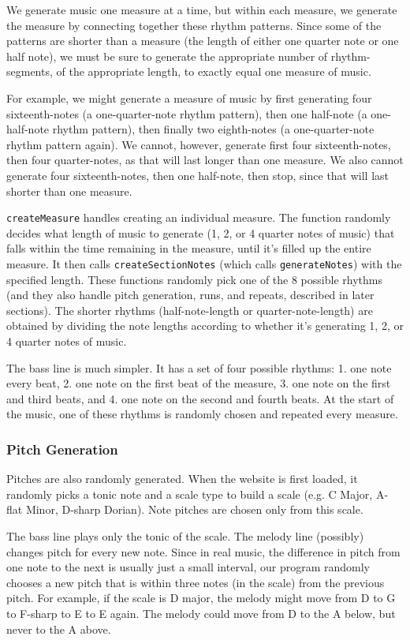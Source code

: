 \documentclass[12pt,a4paper]{article}
\newcommand{\lightcode}[1]{\colorbox{light-gray}{\texttt{#1}}}
\begin{document}
We generate music one measure at a time, but within each measure, we generate the measure by connecting together these rhythm patterns. Since some of the patterns are shorter than a measure (the length of either one quarter note or one half note), we must be sure to generate the appropriate number of rhythm-segments, of the appropriate length, to exactly equal one measure of music.

For example, we might generate a measure of music by first generating four sixteenth-notes (a one-quarter-note rhythm pattern), then one half-note (a one-half-note rhythm pattern), then finally two eighth-notes (a one-quarter-note rhythm pattern again). We cannot, however, generate first four sixteenth-notes, then four quarter-notes, as that will last longer than one measure. We also cannot generate four sixteenth-notes, then one half-note, then stop, since that will last shorter than one measure.

\lightcode{createMeasure} handles creating an individual measure. The function randomly decides what length of music to generate (1, 2, or 4 quarter notes of music) that falls within the time remaining in the measure, until it's filled up the entire measure. It then calls \lightcode{createSectionNotes} (which calls \lightcode{generateNotes}) with the specified length. These functions randomly pick one of the 8 possible rhythms (and they also handle pitch generation, runs, and repeats, described in later sections). The shorter rhythms (half-note-length or quarter-note-length) are obtained by dividing the note lengths according to whether it's generating 1, 2, or 4 quarter notes of music.  

The bass line is much simpler. It has a set of four possible rhythms: 1. one note every beat, 2. one note on the first beat of the measure, 3. one note on the first and third beats, and 4. one note on the second and fourth beats. At the start of the music, one of these rhythms is randomly chosen and repeated every measure.

\subsubsection{Pitch Generation}

Pitches are also randomly generated. When the website is first loaded, it randomly picks a tonic note and a scale type to build a scale (e.g. C Major, A-flat Minor, D-sharp Dorian). Note pitches are chosen only from this scale.

The bass line plays only the tonic of the scale. The melody line (possibly) changes pitch for every new note. Since in real music, the difference in pitch from one note to the next is usually just a small interval, our program randomly chooses a new pitch that is within three notes (in the scale) from the previous pitch. For example, if the scale is D major, the melody might move from D to G to F-sharp to E to E again. The melody could move from D to the A below, but never to the A above.
\end{document}
